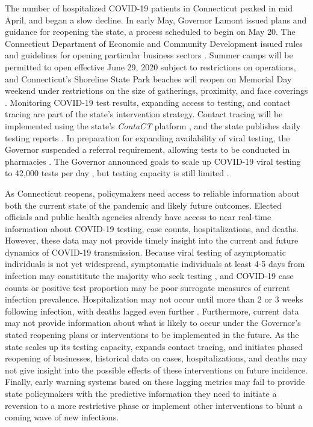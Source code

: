 \documentclass[11pt]{article}
\begin{document}

The number of hospitalized COVID-19 patients in Connecticut peaked in mid April, and began a slow decline.  In early May, Governor Lamont issued plans and guidance for reopening the state, a process scheduled to begin on May 20. The Connecticut Department of Economic and Community Development issued rules and guidelines for opening particular business sectors \citep{decd2020coronavirus}. Summer camps will be permitted to open effective June 29, 2020 subject to restrictions on operations, and Connecticut's Shoreline State Park beaches will reopen on Memorial Day weekend under restrictions on the size of gatherings, proximity, and face coverings \citep{ct2020parks}.  Monitoring COVID-19 test results, expanding access to testing, and contact tracing are part of the state's intervention strategy.  Contact tracing will be implemented using the state's \emph{ContaCT} platform \citep{ct2020contact}, and the state publishes daily testing reports \citep[e.g.][]{ct2020testing}. In preparation for expanding availability of viral testing, the Governor suspended a referral requirement, allowing tests to be conducted in pharmacies \citep{lamont2020suspension,lamont2020exec7kk}. The Governor announced goals to scale up COVID-19 viral testing to 42,000 tests per day \citep{phaneuf2020lamont}, but testing capacity is still limited \cite{thomas2020surge}. 


As Connecticut reopens, policymakers need access to reliable information about both the current state of the pandemic and likely future outcomes.  Elected officials and public health agencies already have access to near real-time information about COVID-19 testing, case counts, hospitalizations, and deaths.  However, these data may not provide timely insight into the current and future dynamics of COVID-19 transmission.  Because viral testing of asymptomatic individuals is not yet widespread, symptomatic individuals at least 4-5 days from infection may constititute the majority who seek testing \citep{lauer2020incubation, bi2020epidemiology, li2020early, linton2020incubation, he2020estimation, salje2020estimating, wei2020presymptomatic}, and COVID-19 case counts or positive test proportion may be poor surrogate measures of current infection prevalence.  Hospitalization may not occur until more than 2 or 3 weeks following infection, with deaths lagged even further \citep{verity2020estimates, bi2020epidemiology, garg2020hospitalization, rees2020covid, lewnard2020incidence, paranjpe2020clinical}.  Furthermore, current data may not provide information about what is likely to occur under the Governor's stated reopening plans or interventions to be implemented in the future. As the state scales up its testing capacity, expands contact tracing, and initiates phased reopening of businesses, historical data on cases, hospitalizations, and deaths may not give insight into the possible effects of these interventions on future incidence.  Finally, early warning systems based on these lagging metrics may fail to provide state policymakers with the predictive information they need to initiate a reversion to a more restrictive phase or implement other interventions to blunt a coming wave of new infections. 
\end{document}
